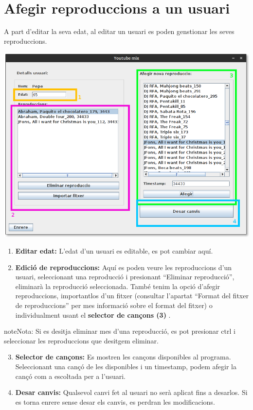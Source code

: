 \documentclass[letterpaper,10pt,oneside]{sphinxmanual}
\begin{document}
\section{Afegir reproduccions a un usuari}
\label{gest_usuaris:afegir-reproduccions-a-un-usuari}
A part d'editar la seva edat, al editar un usuari es poden genstionar les seves reproduccions.

\includegraphics{edit_usr.png}
\begin{enumerate}
\item {} 
\textbf{Editar edat:} L'edat d'un usuari es editable, es pot cambiar aquí.

\item {} 
\textbf{Edició de reproduccions:} Aquí es poden veure les reproduccions d'un usuari, seleccionant una reproducció i presionant ``Eliminar reproducció'', eliminarà la reproducció seleccionada. També tenim la opció d'afegir reproduccions, importantlos d'un fitxer (consultar l'apartat ``Format del fitxer de reproduccions'' per mes informació sobre el format del fitxer) o individualment usant el \textbf{selector de cançons (3)} .

\end{enumerate}

\begin{notice}{note}{Nota:}
Si es desitja eliminar mes d'una reproducció, es pot presionar ctrl i seleccionar les reproduccions que desitgem eliminar.
\end{notice}
\begin{enumerate}
\setcounter{enumi}{2}
\item {} 
\textbf{Selector de cançons:} Es mostren les cançons disponibles al programa. Seleccionant una cançó de les disponibles i un timestamp, podem afegir la cançó com a escoltada per a l'usuari.

\item {} 
\textbf{Desar canvis:} Qualsevol canvi fet al usuari no serà aplicat fins a desarlos. Si es torna enrere sense desar els canvis, es perdran les modificacions.

\end{enumerate}
\end{document}
